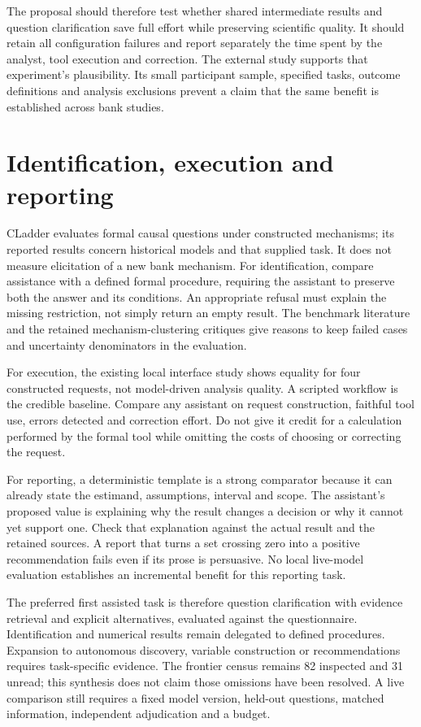 The proposal should therefore test whether shared intermediate results and
question clarification save full effort while preserving scientific quality.
It should retain all configuration failures and report separately the time
spent by the analyst, tool execution and correction. The external study
supports that experiment's plausibility. Its small participant sample,
specified tasks, outcome definitions and analysis exclusions prevent a
claim that the same benefit is established across bank studies.

\section{Identification, execution and reporting}
CLadder evaluates formal causal questions under constructed mechanisms;
its reported results concern historical models and that supplied task.
It does not measure elicitation of a new bank mechanism.
\citep{v12_la_2312_04350}
For identification, compare assistance with a defined formal procedure,
requiring the assistant to preserve both the answer and its conditions.
An appropriate refusal must explain the missing restriction, not simply
return an empty result. The benchmark literature and the retained
mechanism-clustering critiques give reasons to keep failed cases and
uncertainty denominators in the evaluation.

For execution, the existing local interface study shows equality for four
constructed requests, not model-driven analysis quality. A scripted
workflow is the credible baseline. Compare any assistant on request
construction, faithful tool use, errors detected and correction effort.
Do not give it credit for a calculation performed by the formal tool
while omitting the costs of choosing or correcting the request.

For reporting, a deterministic template is a strong comparator because
it can already state the estimand, assumptions, interval and scope.
The assistant's proposed value is explaining why the result changes a
decision or why it cannot yet support one. Check that explanation
against the actual result and the retained sources. A report that turns
a set crossing zero into a positive recommendation fails even if its
prose is persuasive. No local live-model evaluation establishes an
incremental benefit for this reporting task.

The preferred first assisted task is therefore question clarification
with evidence retrieval and explicit alternatives, evaluated against
the questionnaire. Identification and numerical results remain delegated
to defined procedures. Expansion to autonomous discovery, variable
construction or recommendations requires task-specific evidence. The
frontier census remains 82 inspected and 31 unread; this synthesis does
not claim those omissions have been resolved. A live comparison still
requires a fixed model version, held-out questions, matched information,
independent adjudication and a budget.

